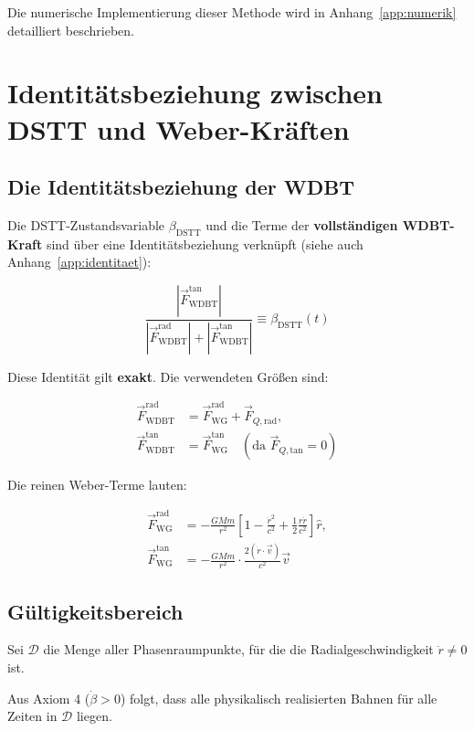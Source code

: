 Die numerische Implementierung dieser Methode wird in Anhang~\ref{app:numerik} detailliert beschrieben.

\section{Identitätsbeziehung zwischen DSTT und Weber-Kräften}
\label{sec:identitaetsbeziehung}

\subsection{Die Identitätsbeziehung der WDBT}

Die DSTT-Zustandsvariable \(\beta_{\text{DSTT}}\) und die Terme der \textbf{vollständigen WDBT-Kraft} sind über eine Identitätsbeziehung verknüpft (siehe auch Anhang~\ref{app:identitaet}):

\[
\boxed{\frac{|\vec{F}_{\text{WDBT}}^{\text{tan}}|}{|\vec{F}_{\text{WDBT}}^{\text{rad}}| + |\vec{F}_{\text{WDBT}}^{\text{tan}}|} \equiv \beta_{\text{DSTT}}(t)}
\]

Diese Identität gilt \textbf{exakt}. Die verwendeten Größen sind:

\[
\begin{aligned}
\vec{F}_{\text{WDBT}}^{\text{rad}} &= \vec{F}_{\text{WG}}^{\text{rad}} + \vec{F}_{Q,\text{rad}}, \\[2mm]
\vec{F}_{\text{WDBT}}^{\text{tan}} &= \vec{F}_{\text{WG}}^{\text{tan}} \quad (\text{da } \vec{F}_{Q,\text{tan}} = 0)
\end{aligned}
\]

Die reinen Weber-Terme lauten:

\[
\begin{aligned}
\vec{F}_{\text{WG}}^{\text{rad}} &= -\frac{GMm}{r^2} \left[ 1 - \frac{\dot{r}^2}{c^2} + \frac{1}{2} \frac{r\ddot{r}}{c^2} \right] \hat{r}, \\[2mm]
\vec{F}_{\text{WG}}^{\text{tan}} &= -\frac{GMm}{r^2} \cdot \frac{2(\dot{r} \cdot \vec{v})}{c^2} \vec{v}
\end{aligned}
\]

\subsection{Gültigkeitsbereich}

Sei \(\mathcal{D}\) die Menge aller Phasenraumpunkte, für die die Radialgeschwindigkeit \(\dot{r} \neq 0\) ist.

Aus Axiom 4 (\(\dot{\beta} > 0\)) folgt, dass alle physikalisch realisierten Bahnen für alle Zeiten in \(\mathcal{D}\) liegen.

